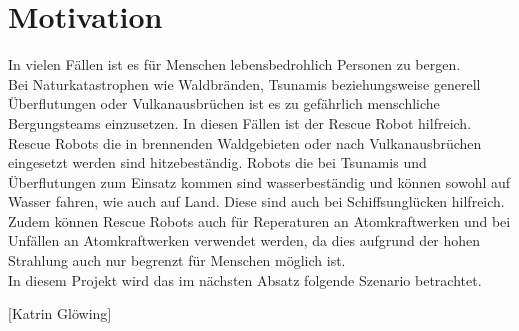\section{Motivation}
In vielen Fällen ist es für Menschen lebensbedrohlich Personen zu bergen.\\
Bei Naturkatastrophen wie Waldbränden, Tsunamis beziehungsweise generell Überflutungen oder Vulkanausbrüchen ist es zu gefährlich menschliche Bergungsteams einzusetzen. In diesen Fällen ist der Rescue Robot hilfreich.\\
Rescue Robots die in brennenden Waldgebieten oder nach Vulkanausbrüchen eingesetzt werden sind hitzebeständig. Robots die bei Tsunamis und Überflutungen zum Einsatz kommen sind wasserbeständig und können sowohl auf Wasser fahren, wie auch auf Land. Diese sind auch bei Schiffsunglücken hilfreich.\\
Zudem können Rescue Robots auch für Reperaturen an Atomkraftwerken und bei Unfällen an Atomkraftwerken verwendet werden, da dies aufgrund der hohen Strahlung auch nur begrenzt für Menschen möglich ist.\\
In diesem Projekt wird das im nächsten Absatz folgende Szenario betrachtet.
\begin{flushright}
	$ [ $Katrin Glöwing$ ] $
\end{flushright}

